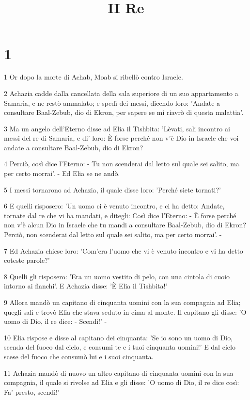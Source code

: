 

\title{II Re}


\chapter{1}

\par 1 Or dopo la morte di Achab, Moab si ribellò contro Israele.
\par 2 Achazia cadde dalla cancellata della sala superiore di un suo appartamento a Samaria, e ne restò ammalato; e spedì dei messi, dicendo loro: 'Andate a consultare Baal-Zebub, dio di Ekron, per sapere se mi riavrò di questa malattia'.
\par 3 Ma un angelo dell'Eterno disse ad Elia il Tishbita: 'Lèvati, sali incontro ai messi del re di Samaria, e di' loro: È forse perché non v'è Dio in Israele che voi andate a consultare Baal-Zebub, dio di Ekron?
\par 4 Perciò, così dice l'Eterno: - Tu non scenderai dal letto sul quale sei salito, ma per certo morrai'. - Ed Elia se ne andò.
\par 5 I messi tornarono ad Achazia, il quale disse loro: 'Perché siete tornati?'
\par 6 E quelli risposero: 'Un uomo ci è venuto incontro, e ci ha detto: Andate, tornate dal re che vi ha mandati, e ditegli: Così dice l'Eterno: - È forse perché non v'è alcun Dio in Israele che tu mandi a consultare Baal-Zebub, dio di Ekron? Perciò, non scenderai dal letto sul quale sei salito, ma per certo morrai'. -
\par 7 Ed Achazia chiese loro: 'Com'era l'uomo che vi è venuto incontro e vi ha detto coteste parole?'
\par 8 Quelli gli risposero: 'Era un uomo vestito di pelo, con una cintola di cuoio intorno ai fianchi'. E Achazia disse: 'È Elia il Tishbita!'
\par 9 Allora mandò un capitano di cinquanta uomini con la sua compagnia ad Elia; quegli salì e trovò Elia che stava seduto in cima al monte. Il capitano gli disse: 'O uomo di Dio, il re dice: - Scendi!' -
\par 10 Elia rispose e disse al capitano dei cinquanta: 'Se io sono un uomo di Dio, scenda del fuoco dal cielo, e consumi te e i tuoi cinquanta uomini!' E dal cielo scese del fuoco che consumò lui e i suoi cinquanta.
\par 11 Achazia mandò di nuovo un altro capitano di cinquanta uomini con la sua compagnia, il quale si rivolse ad Elia e gli disse: 'O uomo di Dio, il re dice così: Fa' presto, scendi!'
